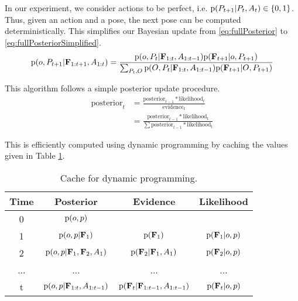             In our experiment, we consider actions to be perfect, i.e. $\text{p}(P_{t+1}|P_t,A_t) \in \{ 0 , 1 \}$. Thus, given an action and a pose, the next pose can be computed deterministically. This simplifies our Bayesian update from \eqref{eq:fullPosterior} to \eqref{eq:fullPosteriorSimplified}.
            \begin{multline}
                \label{eq:fullPosteriorSimplified}
                \prob{o,P_{t+1}|\set{F}_{1:t+1},A_{1:t}} = \frac{\prob{o,P_t|\set{F}_{1:t},A_{1:t-1}} \prob{\set{F}_{t+1}|o,P_{t+1}} }{\sum_{P_t,O} \prob{O,P_t|\set{F}_{1:t},A_{1:t-1}} \prob{\set{F}_{t+1}|O,P_{t+1}} }
            \end{multline}

            This algorithm follows a simple posterior update procedure.
            \begin{align}
                \text{posterior}_t &= \frac{\text{posterior}_{t-1}*\text{likelihood}_t}{\text{evidence}_t}\\
                &= \frac{\text{posterior}_{t-1}*\text{likelihood}_t}{\sum \text{posterior}_{t-1}*\text{likelihood}_t}
            \end{align}

            This is efficiently computed using dynamic programming by caching the values given in Table \ref{tab:dynamicProgramming}.
            \begin{table}[h]
                \centering
                \begin{tabular}{c|c|c|c} %
                    \hline %
                    Time & Posterior & Evidence & Likelihood\\
                    [0.5ex] %
                    \hline\hline %
                    0 & $\text{p}(o,p)$ & & \\[0.5ex] 
                    1 & $\text{p}(o,p|\mathbf{F}_1)$ & $\text{p}(\mathbf{F}_1)$ & $\text{p}(\mathbf{F}_1|o,p)$ \\[0.5ex] 
                    2 & $\text{p}(o,p|\mathbf{F}_1,\mathbf{F}_2,A_1)$ & $\text{p}(\mathbf{F}_2|\mathbf{F}_1,A_1)$ & $\text{p}(\mathbf{F}_2|o,p)$ \\
                    ...&...&...&...\\[0.5ex] 
                    t & $\text{p}(o,p|\mathbf{F}_{1:t},A_{1:t-1})$ & $\text{p}(\mathbf{F}_t|\mathbf{F}_{1:t-1},A_{1:t-1})$ & $\text{p}(\mathbf{F}_t|o,p)$
                \end{tabular}
                \caption{Cache for dynamic programming.}
                \label{tab:dynamicProgramming}
            \end{table}

